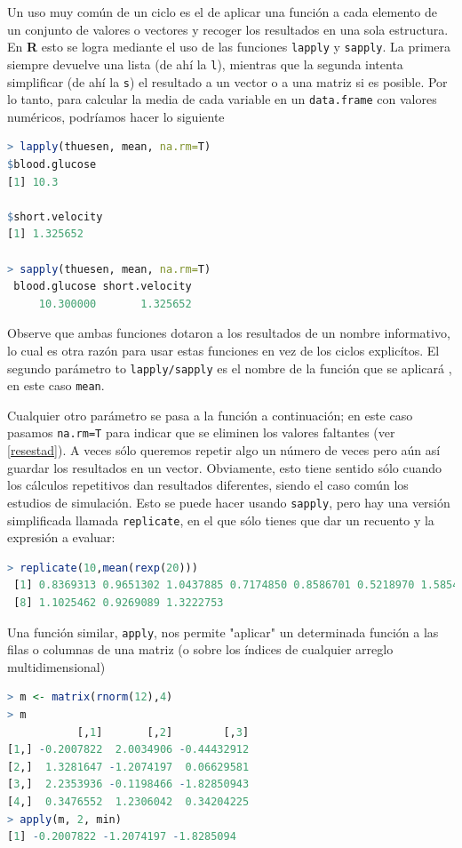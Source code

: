 Un uso muy común de un ciclo es el de aplicar una función a cada elemento de un
conjunto de valores o vectores y recoger los resultados en una sola estructura.
En \textbf{R} esto se logra mediante el uso de las funciones \texttt{lapply} y
\texttt{sapply}. La primera siempre devuelve una lista (de ahí la \texttt{l}),
mientras que la segunda intenta simplificar (de ahí la \texttt{s}) el resultado
a un vector o a una matriz si es posible. Por lo tanto, para calcular la media
de cada variable en un \texttt{data.frame} con valores numéricos, podríamos hacer lo
siguiente

\begin{lstlisting}[language=R]
> lapply(thuesen, mean, na.rm=T)
$blood.glucose
[1] 10.3

$short.velocity
[1] 1.325652

> sapply(thuesen, mean, na.rm=T)
 blood.glucose short.velocity
     10.300000       1.325652
\end{lstlisting}

Observe que ambas funciones dotaron a los resultados de un nombre informativo,
lo cual es otra razón para usar estas funciones en vez de los ciclos
explicítos. El segundo parámetro to \texttt{lapply/sapply} es el nombre de la
función que se aplicará , en este caso \texttt{mean}.

Cualquier otro parámetro se pasa a la función a continuación; en este caso
pasamos \texttt{na.rm=T} para indicar que se eliminen los valores faltantes
(ver \ref{resestad}).  A veces sólo queremos repetir algo un número de veces
pero aún así guardar los resultados en un vector. Obviamente, esto tiene
sentido sólo cuando los cálculos repetitivos dan resultados diferentes, siendo
el caso común los estudios de simulación. Esto se puede hacer usando
\texttt{sapply}, pero hay una versión simplificada llamada \texttt{replicate},
en el que sólo tienes que dar un recuento y la expresión a evaluar:

\begin{lstlisting}[language=R]
> replicate(10,mean(rexp(20)))
 [1] 0.8369313 0.9651302 1.0437885 0.7174850 0.8586701 0.5218970 1.5854871
 [8] 1.1025462 0.9269089 1.3222753
\end{lstlisting}

Una función similar, \texttt{apply}, nos permite "aplicar" un determinada
función a las filas o columnas de una matriz (o sobre los índices de cualquier
arreglo multidimensional)

\begin{lstlisting}[language=R]
> m <- matrix(rnorm(12),4)
> m
           [,1]       [,2]        [,3]
[1,] -0.2007822  2.0034906 -0.44432912
[2,]  1.3281647 -1.2074197  0.06629581
[3,]  2.2353936 -0.1198466 -1.82850943
[4,]  0.3476552  1.2306042  0.34204225
> apply(m, 2, min)
[1] -0.2007822 -1.2074197 -1.8285094
\end{lstlisting}

